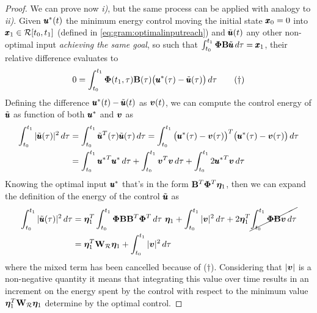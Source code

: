 	\begin{proof}
		We can prove now \textit{i)}, but the same process can be applied with analogy to \textit{ii)}. Given $\pmb{u}^*(t)$ the minimum energy control moving the initial state $\pmb{x}_0 = 0$ into $\pmb{x}_1 \in \mathcal R[t_0,t_1]$ (defined in \ref{eq:gram:optimalinputreach}) and $\tilde {\pmb{u}}(t)$ any other non-optimal input \textit{achieving the same goal}, so such that $\int_{t_0}^{t_1} \mathbf{\Phi} \mathbf{B} \tilde{\pmb{u}}\, d\tau = \pmb{x}_1$, their relative difference evaluates to
		\[ 0 = \int_{t_0}^{t_1} \mathbf{\Phi}(t_1,\tau) \mathbf{B}(\tau) \big(\pmb{u}^*(\tau) - \tilde{\pmb{u}}(\tau) \big)\, d\tau \tag{$\dagger$} \]
		Defining the difference $\pmb{u}^*(t) -  \tilde {\pmb{u}}(t)$ as $\boldsymbol{v}(t)$, we can compute the control energy of $\tilde {\pmb{u}}$ as function of both $\pmb{u}^*$ and $\boldsymbol{v}$ as
		\begin{align*}
			\int_{t_0}^{t_1} |\tilde {\pmb{u}}(\tau)|^2\, d\tau & = \int_{t_0}^{t_1} \tilde {\pmb{u}}^T(\tau) \tilde {\pmb{u}}(\tau) \, d\tau = \int_{t_0}^{t_1} \big(\pmb{u}^*(\tau) - \boldsymbol{v}(\tau)\big)^T\big(\pmb{u}^*(\tau) - \boldsymbol{v}(\tau)\big) \, d\tau \\ 
			& = \int_{t_0}^{t_1} {\pmb{u}^*}^T \pmb{u}^*\, d\tau + \int_{t_0}^{t_1} \boldsymbol{v}^T \boldsymbol{v}\, d\tau + \int_{t_0}^{t_1} 2{\pmb{u}^*}^T \boldsymbol{v} \, d\tau
		\end{align*}
		Knowing the optimal input $\pmb{u}^*$ that's in the form $\mathbf{B}^T \mathbf{\Phi}^T \boldsymbol{\eta}_1$, then we can expand the definition of the energy of the control $\tilde {\pmb{u}}$ as
		\begin{align*}
			\int_{t_0}^{t_1} |\tilde {\pmb{u}}(\tau)|^2\, d\tau & = \boldsymbol{\eta}_1^T \int_{t_0}^{t_1} \mathbf{\Phi} \mathbf{B} \mathbf{B}^T\mathbf{\Phi}^T \, d\tau \ \boldsymbol{\eta}_1 + \int_{t_0}^{t_1} |\boldsymbol{v}|^2 \, d\tau + 2\boldsymbol{\eta}_1^T\cancel{\int_{t_0}^{t_1} \mathbf{\Phi} \mathbf{B} \boldsymbol{v} \, d\tau} \\
			& = \boldsymbol{\eta}_1^T \mathbf{W}_\mathcal R \boldsymbol{\eta}_1 + \int_{t_0}^{t_1} |\boldsymbol{v}|^2\, d\tau
		\end{align*}
		where the mixed term has been cancelled because of ($\dagger$). Considering that $|\boldsymbol{v}|$ is a non-negative quantity it means that integrating this value over time results in an increment on the energy spent by the control with respect to the minimum value $\boldsymbol{\eta}_1^T \mathbf{W}_\mathcal R \boldsymbol{\eta}_1$ determine by the optimal control.
	\end{proof}
	
